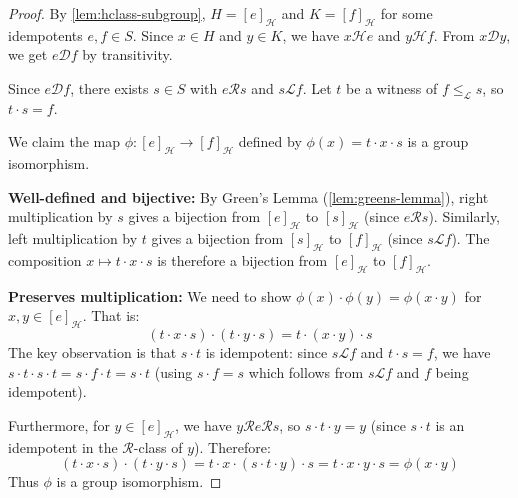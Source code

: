 \begin{proof}
\leanok
By \ref{lem:hclass-subgroup}, $H = [e]_{\mathcal{H}}$ and $K = [f]_{\mathcal{H}}$ for some idempotents $e, f \in S$. Since $x \in H$ and $y \in K$, we have $x \mathcal{H} e$ and $y \mathcal{H} f$. From $x \mathcal{D} y$, we get $e \mathcal{D} f$ by transitivity.

Since $e \mathcal{D} f$, there exists $s \in S$ with $e \mathcal{R} s$ and $s \mathcal{L} f$. Let $t$ be a witness of $f \leq_{\mathcal{L}} s$, so $t \cdot s = f$.

We claim the map $\phi : [e]_{\mathcal{H}} \to [f]_{\mathcal{H}}$ defined by $\phi(x) = t \cdot x \cdot s$ is a group isomorphism.

\textbf{Well-defined and bijective:} By Green's Lemma (\ref{lem:greens-lemma}), right multiplication by $s$ gives a bijection from $[e]_{\mathcal{H}}$ to $[s]_{\mathcal{H}}$ (since $e \mathcal{R} s$). Similarly, left multiplication by $t$ gives a bijection from $[s]_{\mathcal{H}}$ to $[f]_{\mathcal{H}}$ (since $s \mathcal{L} f$). The composition $x \mapsto t \cdot x \cdot s$ is therefore a bijection from $[e]_{\mathcal{H}}$ to $[f]_{\mathcal{H}}$.

\textbf{Preserves multiplication:} We need to show $\phi(x) \cdot \phi(y) = \phi(x \cdot y)$ for $x, y \in [e]_{\mathcal{H}}$. That is:
\[
(t \cdot x \cdot s) \cdot (t \cdot y \cdot s) = t \cdot (x \cdot y) \cdot s
\]
The key observation is that $s \cdot t$ is idempotent: since $s \mathcal{L} f$ and $t \cdot s = f$, we have $s \cdot t \cdot s \cdot t = s \cdot f \cdot t = s \cdot t$ (using $s \cdot f = s$ which follows from $s \mathcal{L} f$ and $f$ being idempotent). 

Furthermore, for $y \in [e]_{\mathcal{H}}$, we have $y \mathcal{R} e \mathcal{R} s$, so $s \cdot t \cdot y = y$ (since $s \cdot t$ is an idempotent in the $\mathcal{R}$-class of $y$). Therefore:
\[
(t \cdot x \cdot s) \cdot (t \cdot y \cdot s) = t \cdot x \cdot (s \cdot t \cdot y) \cdot s = t \cdot x \cdot y \cdot s = \phi(x \cdot y)
\]
Thus $\phi$ is a group isomorphism.
\end{proof}

